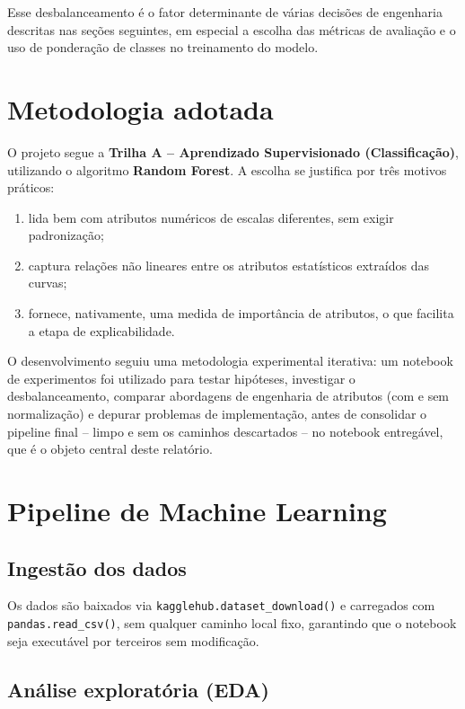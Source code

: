 \documentclass[12pt,a4paper]{article}
\begin{document}
Esse desbalanceamento é o fator determinante de várias decisões de engenharia descritas nas seções seguintes, em especial a escolha das métricas de avaliação e o uso de ponderação de classes no treinamento do modelo.


\section{Metodologia adotada}

O projeto segue a \textbf{Trilha A -- Aprendizado Supervisionado (Classificação)}, utilizando o algoritmo \textbf{Random Forest}. A escolha se justifica por três motivos práticos:

\begin{enumerate}[leftmargin=1.5cm]
    \item lida bem com atributos numéricos de escalas diferentes, sem exigir padronização;
    \item captura relações não lineares entre os atributos estatísticos extraídos das curvas;
    \item fornece, nativamente, uma medida de importância de atributos, o que facilita a etapa de explicabilidade.
\end{enumerate}

O desenvolvimento seguiu uma metodologia experimental iterativa: um notebook de experimentos foi utilizado para testar hipóteses, investigar o desbalanceamento, comparar abordagens de engenharia de atributos (com e sem normalização) e depurar problemas de implementação, antes de consolidar o pipeline final -- limpo e sem os caminhos descartados -- no notebook entregável, que é o objeto central deste relatório.


\section{Pipeline de Machine Learning}

\subsection{Ingestão dos dados}

Os dados são baixados via \texttt{kagglehub.dataset\_download()} e carregados com \texttt{pandas.read\_csv()}, sem qualquer caminho local fixo, garantindo que o notebook seja executável por terceiros sem modificação.

\subsection{Análise exploratória (EDA)}
\end{document}
